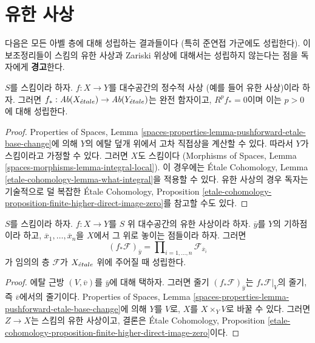 \section{유한 사상}
\label{section-finite-morphisms}

\noindent
다음은 모든 아벨 층에 대해 성립하는 결과들이다
(특히 준연접 가군에도 성립한다).
이 보조정리들이 스킴의 유한 사상과 Zariski 위상에 대해서는
성립하지 않는다는 점을 독자에게 {\bf 경고}한다.

\begin{lemma}
\label{lemma-finite-higher-direct-image-zero}
$S$를 스킴이라 하자. $f : X \to Y$를 대수공간의 정수적 사상
(예를 들어 유한 사상)이라 하자. 그러면
$f_* : \textit{Ab}(X_{\acute{e}tale}) \to \textit{Ab}(Y_{\acute{e}tale})$는
완전 함자이고, $R^pf_* = 0$이며 이는 $p > 0$에 대해 성립한다.
\end{lemma}

\begin{proof}
Properties of Spaces, Lemma
\ref{spaces-properties-lemma-pushforward-etale-base-change}에 의해
$Y$의 에탈 덮개 위에서 고차 직접상을 계산할 수 있다.
따라서 $Y$가 스킴이라고 가정할 수 있다. 그러면 $X$도 스킴이다
(Morphisms of Spaces, Lemma
\ref{spaces-morphisms-lemma-integral-local}).
이 경우에는 \'Etale Cohomology, Lemma
\ref{etale-cohomology-lemma-what-integral}을 적용할 수 있다.
유한 사상의 경우 독자는 기술적으로 덜 복잡한 \'Etale Cohomology,
Proposition
\ref{etale-cohomology-proposition-finite-higher-direct-image-zero}를
참고할 수도 있다.
\end{proof}

\begin{lemma}
\label{lemma-stalk-push-finite}
$S$를 스킴이라 하자. $f : X \to Y$를 $S$ 위 대수공간의 유한
사상이라 하자. $\overline{y}$를 $Y$의 기하점이라 하고,
$\overline{x}_1, \ldots, \overline{x}_n$을 $X$에서 그 위로 놓이는
점들이라 하자. 그러면
$$
(f_*\mathcal{F})_{\overline{y}} =
\prod\nolimits_{i = 1, \ldots, n}
\mathcal{F}_{\overline{x}_i}
$$
가 임의의 층 $\mathcal{F}$가 $X_{\acute{e}tale}$ 위에 주어질 때 성립한다.
\end{lemma}

\begin{proof}
에탈 근방 $(V, \overline{v})$를 $\overline{y}$에 대해 택하자.
그러면 줄기 $(f_*\mathcal{F})_{\overline{y}}$는
$f_*\mathcal{F}|_V$의 줄기, 즉 $\overline{v}$에서의 줄기이다.
Properties of Spaces, Lemma
\ref{spaces-properties-lemma-pushforward-etale-base-change}에 의해
$Y$를 $V$로, $X$를 $X \times_Y V$로 바꿀 수 있다.
그러면
$Z \to X$는 스킴의 유한 사상이고, 결론은 \'Etale Cohomology,
Proposition
\ref{etale-cohomology-proposition-finite-higher-direct-image-zero}이다.
\end{proof}

